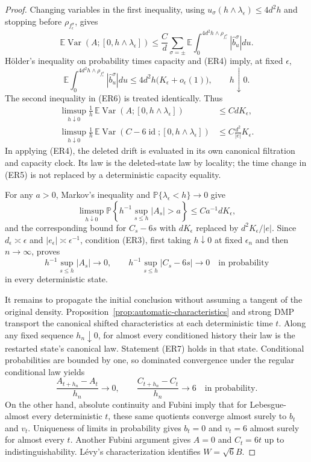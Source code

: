 \documentclass[11pt]{article}
\theoremstyle{definition}\newtheorem{definition}[theorem]{Definition}
\theoremstyle{remark}\newtheorem{remark}[theorem]{Remark}
\begin{document}
\begin{proof}
Changing variables in the first inequality, using
$u_\sigma(h\wedge\lambda_\epsilon)\le4d^2h$ and stopping before
$\rho_{f_\epsilon^\sigma}$, gives
\[
 \mathbb E\operatorname{Var}(A;[0,h\wedge\lambda_\epsilon])
 \le\frac Cd\sum_{\sigma=\pm}
   \mathbb E\int_0^{4d^2h\wedge\rho_{f_\epsilon^\sigma}}
                     |\widehat b^\sigma_u|du.
\]
H\"older's inequality on probability times capacity and (ER4) imply,
at fixed $\epsilon$,
\[
 \mathbb E\int_0^{4d^2h\wedge\rho_{f_\epsilon^\sigma}}
           |\widehat b^\sigma_u|du
       \le4d^2h\bigl(K_\epsilon+o_\epsilon(1)\bigr),
       \qquad h\downarrow0.
\]
The second inequality in (ER6) is treated identically. Thus
\begin{align}
 \limsup_{h\downarrow0}\frac1h\,
  \mathbb E\operatorname{Var}(A;[0,h\wedge\lambda_\epsilon])
       &\le CdK_\epsilon,\label{eq:energy-drift-slit-bound}\\
 \limsup_{h\downarrow0}\frac1h\,
  \mathbb E\operatorname{Var}(C-6\operatorname{id};
                            [0,h\wedge\lambda_\epsilon])
       &\le C\frac{d^2}{|e|}K_\epsilon.
       \label{eq:energy-bracket-slit-bound}
\end{align}
In applying (ER4), the deleted drift is evaluated in its own canonical
filtration and capacity clock. Its law is the deleted-state law by
locality; the time change in (ER5) is not replaced by a deterministic
capacity equality.

For any $a>0$, Markov's inequality and
$\mathbb P\{\lambda_\epsilon<h\}\to0$ give
\[
 \limsup_{h\downarrow0}\mathbb P\left\{
       h^{-1}\sup_{s\le h}|A_s|>a\right\}
           \le C a^{-1}dK_\epsilon,
\]
and the corresponding bound for $C_s-6s$ with
$dK_\epsilon$ replaced by $d^2K_\epsilon/|e|$.
Since $d_\epsilon\asymp\epsilon$ and
$|e_\epsilon|\asymp\epsilon^{-1}$, condition (ER3), first taking
$h\downarrow0$ at fixed $\epsilon_n$ and then $n\to\infty$, proves
\[
 h^{-1}\sup_{s\le h}|A_s|\longrightarrow0,\qquad
 h^{-1}\sup_{s\le h}|C_s-6s|\longrightarrow0
          \quad\text{in probability}
 \tag{ER7}
\]
in every deterministic state.

It remains to propagate the initial conclusion without assuming a
tangent of the original density. Proposition~\ref{prop:automatic-characteristics}
and strong DMP transport the canonical shifted characteristics at each
deterministic time $t$. Along any fixed sequence $h_n\downarrow0$,
for almost every conditioned history their law is the restarted state's
canonical law. Statement (ER7) holds in that state. Conditional
probabilities are bounded by one, so dominated convergence under the
regular conditional law yields
\[
 \frac{A_{t+h_n}-A_t}{h_n}\longrightarrow0,
 \qquad
 \frac{C_{t+h_n}-C_t}{h_n}\longrightarrow6
          \quad\text{in probability}.
 \tag{ER8}
\]
On the other hand, absolute continuity and Fubini imply that for
Lebesgue-almost every deterministic $t$, these same quotients converge
almost surely to $b_t$ and $v_t$. Uniqueness of limits in probability
gives $b_t=0$ and $v_t=6$ almost surely for almost every $t$.
Another Fubini argument gives $A=0$ and $C_t=6t$ up to
indistinguishability. L\'evy's characterization identifies $W=\sqrt6 B$.
\end{proof}
\end{document}

